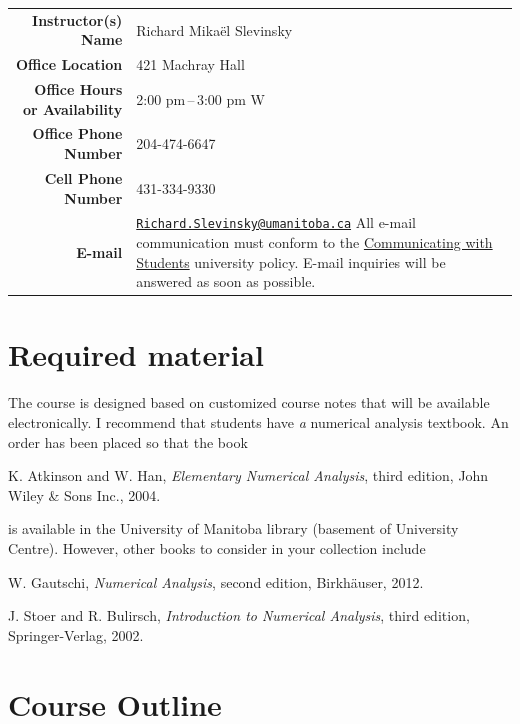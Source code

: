 \documentclass[12pt]{article}
\newlength{\infoTableSpace}
\begin{document}
\noindent
\begin{tabular*}{\linewidth}{r@{\hspace{\infoTableSpace}}l}
	\toprule
	\textbf{Instructor(s) Name} 			& Richard Mika\"el Slevinsky 	\\ 
	\textbf{Office Location}				& 421 Machray Hall	\\
	\textbf{Office Hours or Availability} & 2:00 pm\,--\,3:00 pm W \\
	\textbf{Office Phone Number} 			& 204-474-6647	\\
	\textbf{Cell Phone Number} 			& 431-334-9330	\\
	\textbf{E-mail}	& \begin{minipage}[t]{0.65\linewidth}	
			\href{mailto:Richard.Slevinsky@umanitoba.ca}{\texttt{Richard.Slevinsky@umanitoba.ca}}
			All e-mail communication must conform to the 
			\href{http://umanitoba.ca/admin/governance/media/Electronic_Communication_with_Students_Policy_-_2014_06_05.pdf}{Communicating with Students} university policy. E-mail inquiries will be answered as soon as possible.			
		\end{minipage} \\
	\bottomrule
\end{tabular*}


\section{Required material}

The course is designed based on customized course notes that will be available electronically. I recommend that students have {\em a} numerical analysis textbook. An order has been placed so that the book

K. Atkinson and W. Han, {\em Elementary Numerical Analysis}, third edition, John Wiley \& Sons Inc., 2004.

is available in the University of Manitoba library (basement of University Centre). However, other books to consider in your collection include

W. Gautschi, {\em Numerical Analysis}, second edition, Birkh\"auser, 2012.

J. Stoer and R. Bulirsch, {\em Introduction to Numerical Analysis}, third edition, Springer-Verlag, 2002.

\section{Course Outline}
\end{document}
